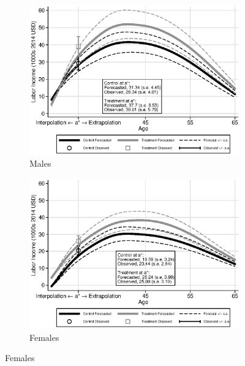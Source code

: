 \begin{figure}
\centering
\caption{Forecasted Labor Income Profiles for ABC/CARE Participants}\label{fig:labor-income-profiles}
\begin{subfigure}[h]{0.5\textwidth}
		\centering
		\caption{Males} \label{fig:labor-income-profilesc}
		\includegraphics[width=\textwidth]{output/labor_25-65_pset1_mset1_male.eps}
\end{subfigure}%
\begin{subfigure}[h]{0.5\textwidth}
		\centering
		\caption{Females} \label{fig:labor-income-profilesa}
		\includegraphics[width=\textwidth]{output/labor_25-65_pset1_mset1_female.eps}
\end{subfigure}
\footnotesize \justify

\end{figure}

